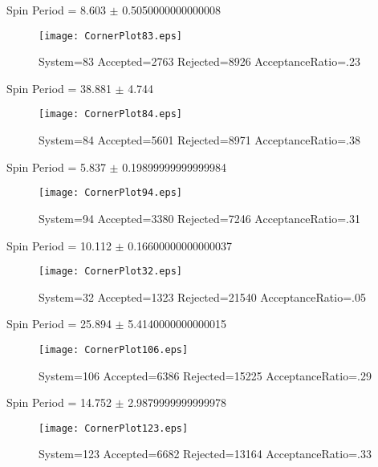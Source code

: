 \documentclass[10pt]{article}
\begin{document}
\newpage
\begin{center}
        Spin Period = 8.603 $\pm$ 0.5050000000000008
        \end{center}
\begin{figure}[H] 
        \texttt{[image: CornerPlot83.eps]}
        \caption{System=83 Accepted=2763 Rejected=8926 AcceptanceRatio=.23}
        \label{S83}
        \centering
        \end{figure}
\newpage
\begin{center}
        Spin Period = 38.881 $\pm$ 4.744
        \end{center}
\begin{figure}[H] 
        \texttt{[image: CornerPlot84.eps]}
        \caption{System=84 Accepted=5601 Rejected=8971 AcceptanceRatio=.38}
        \label{S84}
        \centering
        \end{figure}
\newpage
\begin{center}
        Spin Period = 5.837 $\pm$ 0.19899999999999984
        \end{center}
\begin{figure}[H] 
        \texttt{[image: CornerPlot94.eps]}
        \caption{System=94 Accepted=3380 Rejected=7246 AcceptanceRatio=.31}
        \label{S94}
        \centering
        \end{figure}
\newpage
\begin{center}
        Spin Period = 10.112 $\pm$ 0.16600000000000037
        \end{center}
\begin{figure}[H] 
        \texttt{[image: CornerPlot32.eps]}
        \caption{System=32 Accepted=1323 Rejected=21540 AcceptanceRatio=.05}
        \label{S32}
        \centering
        \end{figure}
\newpage
\begin{center}
        Spin Period = 25.894 $\pm$ 5.4140000000000015
        \end{center}
\begin{figure}[H] 
        \texttt{[image: CornerPlot106.eps]}
        \caption{System=106 Accepted=6386 Rejected=15225 AcceptanceRatio=.29}
        \label{S106}
        \centering
        \end{figure}
\newpage
\begin{center}
        Spin Period = 14.752 $\pm$ 2.9879999999999978
        \end{center}
\begin{figure}[H] 
        \texttt{[image: CornerPlot123.eps]}
        \caption{System=123 Accepted=6682 Rejected=13164 AcceptanceRatio=.33}
        \label{S123}
        \centering
        \end{figure}
\end{document}
